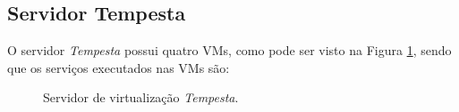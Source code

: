 \subsection{Servidor Tempesta}
\label{section:serv_tempesta}

O servidor \textit{Tempesta} possui quatro \ac{VM}s, como pode ser visto na Figura \ref{fig:servidor_tempesta}, sendo que os serviços executados 
nas \ac{VM}s são:

\begin{figure}[h!]
 \centering
 \caption{Servidor de virtualização \textit{Tempesta}.}
 \label{fig:servidor_tempesta}
\end{figure}

